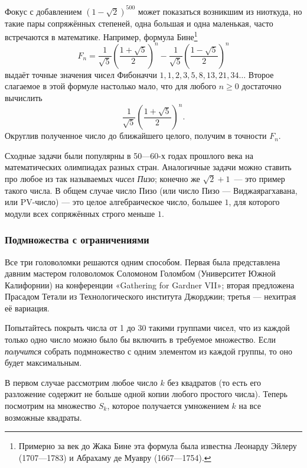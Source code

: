 Фокус с добавлением $(1-\sqrt{2})^{500}$ может показаться возникшим из ниоткуда, но такие пары сопряжённых степеней, одна большая и одна маленькая, часто встречаются в математике.
Например, формула Бине\footnote{Примерно за век до Жака Бине эта формула была известна Леонарду Эйлеру (1707---1783) и Абрахаму де Муавру (1667---1754).}
\[F_n=\frac{1}{\sqrt{5}}\left(\frac{1+\sqrt{5}}2\right)^n-\frac{1}{\sqrt{5}}\left(\frac{1-\sqrt{5}}2\right)^n\]
выдаёт точные значения чисел Фибоначчи $1, 1, 2, 3, 5, 8, 13, 21, 34 \dots$
Второе слагаемое в этой формуле настолько мало, что для любого $n \ge 0$ достаточно вычислить
\[\frac{1}{\sqrt{5}}\left(\frac{1+\sqrt{5}}2\right)^n.\]
Округлив полученное число до ближайшего целого, получим в точности $F_n$.

\begin{addedbytheeditors}
Сходные задачи были популярны в 50---60-х годах прошлого века на математических олимпиадах разных стран.
Аналогичные задачи можно ставить про любое из так называемых \emph{чисел Пизо}; конечно же $\sqrt{2}+1$~--- это пример такого числа.
В общем случае число Пизо (или число Пизо --- Виджаярагхавана, или PV-число) --- это целое алгебраическое число, большее $1$, для которого модули всех сопряжённых строго меньше $1$.
\pr
%
\end{addedbytheeditors}

\subsubsection*{Подмножества с ограничениями}

Все три головоломки решаются одним способом.
Первая была представлена давним мастером головоломок Соломоном Голомбом (Университет Южной Калифорнии) на конференции
«Ga\-the\-ring for Gard\-ner VII»;
вторая предложена Прасадом Тетали из Технологического института Джорджии;
третья --- нехитрая её вариация.

Попытайтесь покрыть числа от 1 до 30 такими группами чисел, что из каждой только одно число можно было бы включить в требуемое множество.
Если \emph{получится} собрать подмножество с одним элементом из каждой группы, то оно будет максимальным.

В первом случае рассмотрим любое число $k$ без квадратов (то есть его разложение содержит не больше одной копии любого простого числа).
Теперь посмотрим на множество $S_k$, которое получается умножением $k$ на все возможные квадраты.

